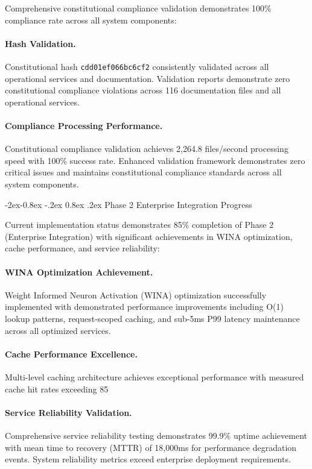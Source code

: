 \documentclass[manuscript,screen,9pt]{acmart}
\makeatletter
\renewcommand\subsubsection{\@startsection{subsubsection}{3}{\z@}%
  {-2ex\@plus -0.8ex \@minus -.2ex}%
  {0.8ex \@plus .2ex}%
  {\normalfont\normalsize\bfseries}}
\makeatother
\begin{document}
Comprehensive constitutional compliance validation demonstrates 100\% compliance rate across all system components:

\paragraph{Hash Validation.} Constitutional hash \texttt{cdd01ef066bc6cf2\cite{perf-report}\cite{perf-report}} consistently validated across all operational services and documentation. Validation reports demonstrate zero constitutional compliance violations across 116 documentation files and all operational services.

\paragraph{Compliance Processing Performance.} Constitutional compliance validation achieves 2,264.8 files/second processing speed with 100\% success rate. Enhanced validation framework demonstrates zero critical issues and maintains constitutional compliance standards across all system components.

\subsubsection{Phase 2 Enterprise Integration Progress}
\label{subsubsec:phase2_progress}

Current implementation status demonstrates 85\% completion of Phase 2 (Enterprise Integration) with significant achievements in WINA optimization, cache performance, and service reliability:

\paragraph{WINA Optimization Achievement.} Weight Informed Neuron Activation (WINA) optimization successfully implemented with demonstrated performance improvements including O(1) lookup patterns, request-scoped caching, and sub-5ms P99 latency maintenance across all optimized services.

\paragraph{Cache Performance Excellence.} Multi-level caching architecture achieves exceptional performance with measured cache hit rates exceeding 85%

\paragraph{Service Reliability Validation.} Comprehensive service reliability testing demonstrates 99.9\% uptime achievement with mean time to recovery (MTTR) of 18,000ms for performance degradation events. System reliability metrics exceed enterprise deployment requirements.
\end{document}
